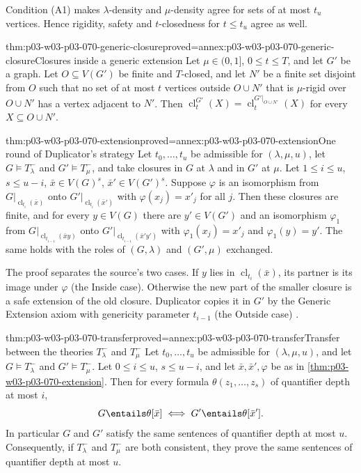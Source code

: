 Condition (A1) makes \(\lambda\)-density and \(\mu\)-density agree for sets
of at most \(t_u\) vertices.  Hence rigidity, safety and \(t\)-closedness for
\(t\leq t_u\) agree as well.

\begin{hblemma}{thm:p03-w03-p03-070-generic-closure}{proved=annex:p03-w03-p03-070-generic-closure}{Closures inside a generic extension}
Let \(\mu\in(0,1]\), \(0\leq t\leq T\), and let \(G'\) be a graph.  Let
\(O\subseteq V(G')\) be finite and \(T\)-closed, and let \(N'\) be a finite
set disjoint from \(O\) such that no set of at most \(t\) vertices outside
\(O\cup N'\) that is \(\mu\)-rigid over \(O\cup N'\) has a vertex adjacent to
\(N'\).  Then
\(\operatorname{cl}^{G'}_t(X)=\operatorname{cl}^{G'|_{O\cup N'}}_t(X)\) for
every \(X\subseteq O\cup N'\).
\end{hblemma}

\begin{hblemma}{thm:p03-w03-p03-070-extension}{proved=annex:p03-w03-p03-070-extension}{One round of Duplicator's strategy}
Let \(t_0,\ldots,t_u\) be admissible for \((\lambda,\mu,u)\), let
\(G\models T^-_\lambda\) and \(G'\models T^-_\mu\), and take closures in
\(G\) at \(\lambda\) and in \(G'\) at \(\mu\).  Let \(1\leq i\leq u\),
\(s\leq u-i\), \(\bar x\in V(G)^s\), \(\bar x'\in V(G')^s\).  Suppose
\(\varphi\) is an isomorphism from \(G|_{\operatorname{cl}_{t_i}(\bar x)}\)
onto \(G'|_{\operatorname{cl}_{t_i}(\bar x')}\) with \(\varphi(x_j)=x'_j\)
for all \(j\).  Then these closures are finite, and for every \(y\in V(G)\)
there are \(y'\in V(G')\) and an isomorphism \(\varphi_1\) from
\(G|_{\operatorname{cl}_{t_{i-1}}(\bar xy)}\) onto
\(G'|_{\operatorname{cl}_{t_{i-1}}(\bar x'y')}\) with \(\varphi_1(x_j)=x'_j\)
and \(\varphi_1(y)=y'\).  The same holds with the roles of
\((G,\lambda)\) and \((G',\mu)\) exchanged.
\end{hblemma}

The proof separates the source's two cases.  If \(y\) lies in
\(\operatorname{cl}_{t_i}(\bar x)\), its partner is its image under
\(\varphi\) (the Inside case).  Otherwise the new part of the smaller
closure is a safe extension of the old closure.  Duplicator copies it in
\(G'\) by the Generic Extension axiom with genericity parameter \(t_{i-1}\)
(the Outside case) \cite[p.~12]{Spencer2007LogicRandomStructuresAuthor}.

\begin{hbtheorem}{thm:p03-w03-p03-070-transfer}{proved=annex:p03-w03-p03-070-transfer}{Transfer between the theories \(T^-_\lambda\) and \(T^-_\mu\)}
Let \(t_0,\ldots,t_u\) be admissible for \((\lambda,\mu,u)\), and let
\(G\models T^-_\lambda\) and \(G'\models T^-_\mu\).  Let \(0\leq i\leq u\),
\(s\leq u-i\), and let \(\bar x,\bar x',\varphi\) be as in
\cref{thm:p03-w03-p03-070-extension}.  Then for every formula
\(\theta(z_1,\ldots,z_s)\) of quantifier depth at most \(i\),
\[
  G\entails\theta[\bar x]\iff G'\entails\theta[\bar x'].
\]
In particular \(G\) and \(G'\) satisfy the same sentences of quantifier depth
at most \(u\).  Consequently, if \(T^-_\lambda\) and \(T^-_\mu\) are both
consistent, they prove the same sentences of quantifier depth at most \(u\).
\end{hbtheorem}

